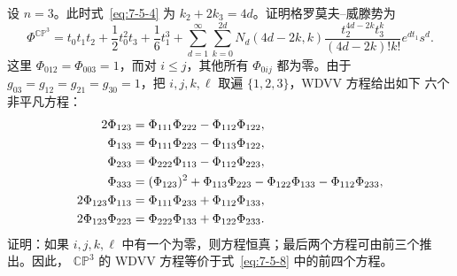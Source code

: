 \begin{exercise}\label{ex:7-5-17}
设 $n=3$。此时式~\eqref{eq:7-5-4} 为 $k_2+2k_3=4d$。证明格罗莫夫--威滕势为
\[
  \Phi^{\mathbb{CP}^3}
  =t_0t_1t_2+\frac12t_0^2t_3+\frac16t_1^3
   +\sum_{d=1}^\infty\sum_{k=0}^{2d}
    N_d(4d-2k,k)
    \frac{t_2^{4d-2k}t_3^k}{(4d-2k)!k!}e^{dt_1}s^d.
\]
这里 $\Phi_{012}=\Phi_{003}=1$，而对 $i\le j$，其他所有 $\Phi_{0ij}$ 都为零。由于
$g_{03}=g_{12}=g_{21}=g_{30}=1$，把 $i,j,k,\ell$ 取遍 $\{1,2,3\}$，WDVV 方程给出如下
六个非平凡方程：
\begin{align}
  2\Phi_{123}
    &=\Phi_{111}\Phi_{222}-\Phi_{112}\Phi_{122},\notag\\
  \Phi_{133}
    &=\Phi_{111}\Phi_{223}-\Phi_{113}\Phi_{122},\notag\\
  \Phi_{233}
    &=\Phi_{222}\Phi_{113}-\Phi_{112}\Phi_{223},\notag\\
  \Phi_{333}
    &=(\Phi_{123})^2+\Phi_{113}\Phi_{223}
      -\Phi_{122}\Phi_{133}-\Phi_{112}\Phi_{233},\label{eq:7-5-8}\\
  2\Phi_{123}\Phi_{113}
    &=\Phi_{111}\Phi_{233}+\Phi_{112}\Phi_{133},\notag\\
  2\Phi_{123}\Phi_{223}
    &=\Phi_{222}\Phi_{133}+\Phi_{122}\Phi_{233}.\notag
\end{align}
证明：如果 $i,j,k,\ell$ 中有一个为零，则方程恒真；最后两个方程可由前三个推出。因此，
$\mathbb{CP}^3$ 的 WDVV 方程等价于式~\eqref{eq:7-5-8} 中的前四个方程。


\end{exercise}
